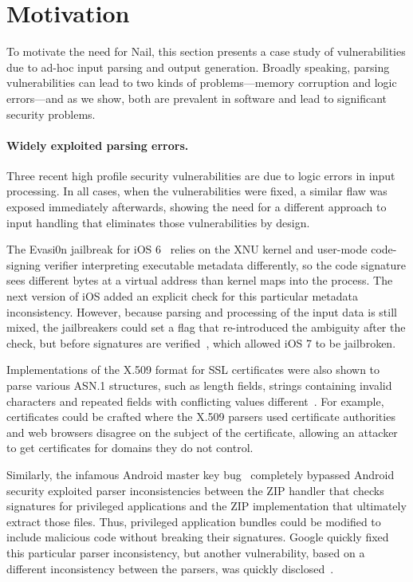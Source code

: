 \section{Motivation}
\label{s:motivation}

To motivate the need for Nail, this section presents a case study of
vulnerabilities due to ad-hoc input parsing and output generation.
Broadly speaking, parsing vulnerabilities can lead to two kinds of
problems---memory corruption and logic errors---and as we show, both
are prevalent in software and lead to significant security problems.

\paragraph{Widely exploited parsing errors.}

Three recent high profile security vulnerabilities are due to logic
errors in input processing.  In all cases, when the vulnerabilities were
fixed, a similar flaw was exposed immediately afterwards, showing the
need for a different approach to input handling that eliminates those
vulnerabilities by design.

The Evasi0n jailbreak for iOS 6~\cite{evaders6} relies on the XNU kernel and
user-mode code-signing verifier interpreting executable metadata differently, so the code signature
sees different bytes at a virtual address than kernel maps into the process. The next version of iOS
added an explicit check for this particular metadata inconsistency. However, because parsing and
processing of the input data is still mixed, the jailbreakers could set a flag that re-introduced
the ambiguity after the check, but before signatures are verified~\cite{geohot-evasion}, which
allowed iOS 7 to be jailbroken.

Implementations of the X.509 format for SSL certificates were also shown to parse various ASN.1
structures, such as length fields, strings containing invalid characters and repeated fields with
conflicting values different~\cite{DBLP:conf/fc/KaminskyPS10}. For example, certificates could be
crafted where the X.509 parsers used certificate authorities and web browsers disagree on the
subject of the certificate, allowing an attacker to get certificates for domains they do not control.

Similarly, the infamous Android master key bug~\cite{saurik-masterkey} completely bypassed Android
security exploited parser inconsistencies
between the ZIP handler that checks signatures for privileged applications and the ZIP
implementation that ultimately extract those files. Thus, privileged application bundles could be
modified to include malicious code without breaking their signatures. Google quickly fixed this
particular parser inconsistency, but another vulnerability, based on a different inconsistency
between the parsers, was quickly disclosed~\cite{saurik-masterkey2}.

